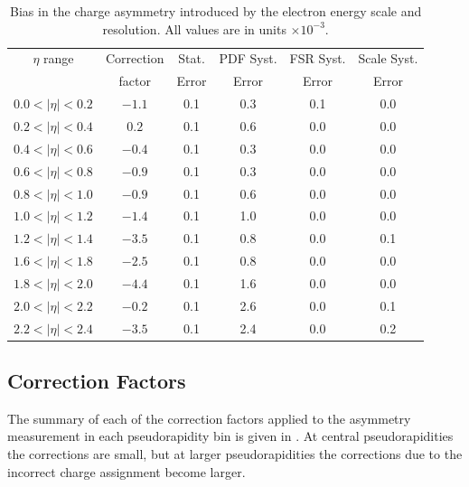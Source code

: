 \begin{table}[htbp]
  \begin{center}
    \begin{tabular}{cccccc}
\toprule
$\eta$ range & Correction  & Stat.   &PDF  Syst. &  FSR Syst. & Scale Syst.\\
          & factor & Error & Error   & Error  & Error  \\
     \midrule
 $0.0<|\eta|<0.2$ & $-1.1$ & 0.1 & 0.3  &0.1 & 0.0\\
 $0.2<|\eta|<0.4$ & $ 0.2$ & 0.1 & 0.6  &0.0 & 0.0\\
 $0.4<|\eta|<0.6$ & $-0.4$ & 0.1 & 0.3  &0.0 & 0.0\\
 $0.6<|\eta|<0.8$ & $-0.9$ & 0.1 & 0.3  &0.0 & 0.0\\
 $0.8<|\eta|<1.0$ & $-0.9$ & 0.1 & 0.6  &0.0 & 0.0\\
 $1.0<|\eta|<1.2$ & $-1.4$ & 0.1 & 1.0  &0.0 & 0.0\\
 $1.2<|\eta|<1.4$ & $-3.5$ & 0.1 & 0.8  &0.0 & 0.1\\
 $1.6<|\eta|<1.8$ & $-2.5$ & 0.1 & 0.8  &0.0 & 0.0\\
 $1.8<|\eta|<2.0$ & $-4.4$ & 0.1 & 1.6  &0.0 & 0.0\\
 $2.0<|\eta|<2.2$ & $-0.2$ & 0.1 & 2.6  &0.0 & 0.1\\
 $2.2<|\eta|<2.4$ & $-3.5$ & 0.1 & 2.4  &0.0 & 0.2\\
\bottomrule
    \end{tabular}
    \caption[Bias in the charge asymmetry introduced by the electron energy
scale and resolution.] {\label{tab:energyscalecorr}Bias in the charge asymmetry
introduced by the electron energy scale and resolution.  All values are in units
$\times 10^{-3}$\cite{bendavid2011electron}.}
  \end{center}
\end{table}

\subsection{Correction Factors}
The summary of each of the correction factors applied to the asymmetry
measurement in each pseudorapidity bin is given in
. At central pseudorapidities the corrections are
small, but at larger pseudorapidities the corrections due to the incorrect
charge assignment become larger.

